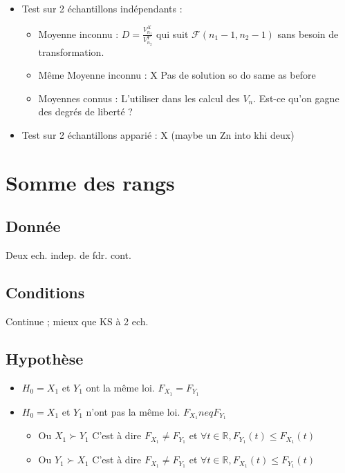 \documentclass[9pt]{article}
\theoremstyle{plain}%
\theoremstyle{definition}
\theoremstyle{remark}
\begin{document}
\begin{multicols}{3}
\begin{itemize}
    \item Test sur 2 échantillons indépendants : \begin{itemize}
        \item Moyenne inconnu : $ D = \frac{V_{n_1}^X}{V_{n_2}^Y} $ qui suit $ \mathcal{F}(n_1 - 1, n_2 - 1) $ sans besoin de transformation.
        \item Même Moyenne inconnu : X Pas de solution so do same as before
        \item Moyennes connus : L'utiliser dans les calcul des $ V_n $. Est-ce qu'on gagne des degrés de liberté ?
    \end{itemize}

    \item Test sur 2 échantillons apparié : X (maybe un Zn into khi deux)
\end{itemize}

\section{Somme des rangs}
\subsection*{Donnée}
Deux ech. indep. de fdr. cont.

\subsection*{Conditions}
Continue ; mieux que KS à 2 ech.

\subsection*{Hypothèse}
\begin{itemize}
    \item $ H_0 = X_1 $ et $ Y_1 $ ont la même loi. $ F_{X_1} = F_{Y_1} $ 
    \item $ H_0 = X_1 $ et $ Y_1 $ n'ont pas la même loi. $ F_{X_1} neq F_{Y_1} $ \begin{itemize}
        \item Ou $ X_1 \succ Y_1 $ C'est à dire $ F_{X_1} \neq F_{Y_1} $ et $ \forall t \in \mathbb{R}, F_{Y_1}(t) \leq F_{X_1}(t) $ 
        \item Ou $ Y_1 \succ X_1 $ C'est à dire $ F_{X_1} \neq F_{Y_1} $ et $ \forall t \in \mathbb{R}, F_{X_1}(t) \leq F_{Y_1}(t) $ 
    \end{itemize}
\end{itemize}


\end{multicols}
\end{document}
